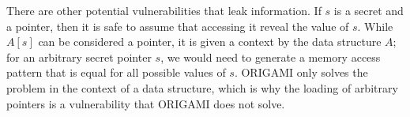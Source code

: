 







There are other potential vulnerabilities that leak information. If $s$ is a secret and a pointer, then it is safe to assume that accessing it reveal the value of $s$. While $A[s]$ can be considered a pointer, it is given a context by the data structure $A$; for an arbitrary secret pointer $s$, we would need to generate a memory access pattern that is equal for all possible values of $s$. ORIGAMI only solves the problem in the context of a data structure, which is why the loading of arbitrary pointers is a vulnerability that ORIGAMI does not solve. 



